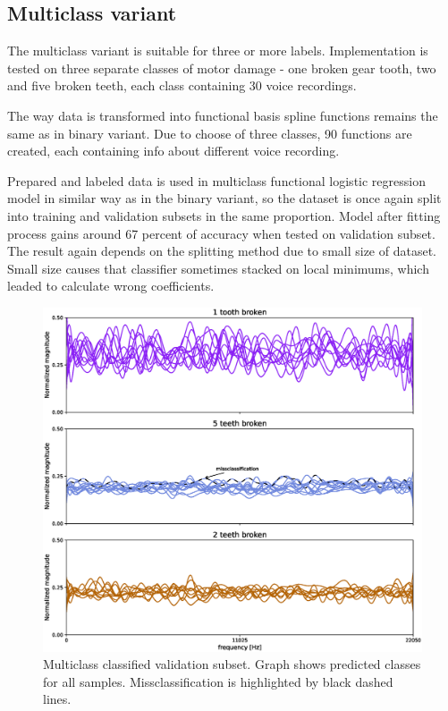 \documentclass[energies,article,submit,pdftex,moreauthors]{Definitions/mdpi}
\begin{document}

\subsection{Multiclass variant}

The multiclass variant is suitable for three or more labels. Implementation is tested on three separate classes of motor damage - one broken gear tooth, two and five broken teeth, each class containing 30 voice recordings.

The way data is transformed into functional basis spline functions remains the same as in binary variant. Due to choose of three classes, 90 functions are created, each containing info about different voice recording. 

Prepared and labeled data is used in multiclass functional logistic regression model in similar way as in the binary variant, so the dataset is once again split into training and validation subsets in the same proportion. Model after fitting process gains around 67 percent of accuracy when tested on validation subset. The result again depends on the splitting method due to small size of dataset. Small size causes that classifier sometimes stacked on local minimums, which leaded to calculate wrong coefficients. 

\begin{figure}[H]
\centering
\includegraphics[width=\textwidth]{images/multiclass_classification}
\caption{Multiclass classified validation subset. Graph shows predicted classes for all samples. Missclassification is highlighted by black dashed lines.}
\label{fig:multiclass}
\end{figure}
\unskip
\vspace{5mm}
\end{document}
